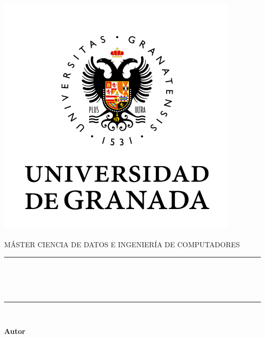 \begin{titlepage}
    \begin{minipage}{\textwidth}
        \centering

        \includegraphics[scale=0.5]{img/ugr.png}\\

        \textsc{\Large \asignatura{}\\[0.2cm]}
        \textsc{MÁSTER CIENCIA DE DATOS E INGENIERÍA DE COMPUTADORES}\\[1cm]

        \noindent\rule[-1ex]{\textwidth}{1pt}\\[1.5ex]
        \textsc{{\Huge \titulo\\[0.5ex]}}
        \textsc{{\Large \subtitulo\\}}
        \noindent\rule[-1ex]{\textwidth}{2pt}\\[2.5ex]

        \end{minipage}

        \vspace{0.3cm}

        \begin{minipage}{\textwidth}

        \centering

        \textbf{Autor}\\ {\autor{}}\\{\email{}}\\[1.5ex]
        \vspace{0.4cm}


\end{minipage}
\end{titlepage}
